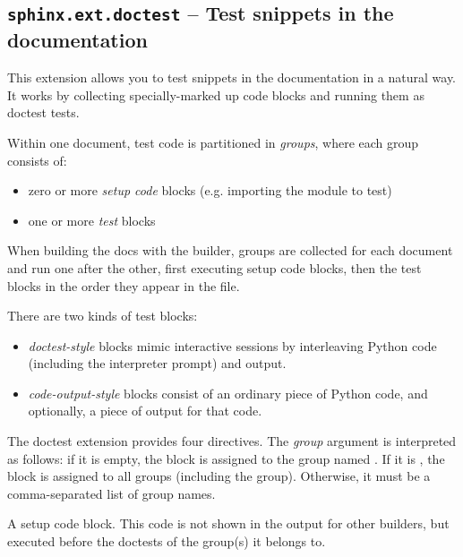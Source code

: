 \documentclass[letterpaper,10pt,english]{sphinxmanual}
\begin{document}
\subsection{\texttt{sphinx.ext.doctest} -- Test snippets in the documentation}
\label{ext/doctest::doc}\label{ext/doctest:module-sphinx.ext.doctest}\label{ext/doctest:sphinx-ext-doctest-test-snippets-in-the-documentation}
This extension allows you to test snippets in the documentation in a natural
way.  It works by collecting specially-marked up code blocks and running them as
doctest tests.

Within one document, test code is partitioned in \emph{groups}, where each group
consists of:
\begin{itemize}
\item {} 
zero or more \emph{setup code} blocks (e.g. importing the module to test)

\item {} 
one or more \emph{test} blocks

\end{itemize}

When building the docs with the  builder, groups are collected for
each document and run one after the other, first executing setup code blocks,
then the test blocks in the order they appear in the file.

There are two kinds of test blocks:
\begin{itemize}
\item {} 
\emph{doctest-style} blocks mimic interactive sessions by interleaving Python code
(including the interpreter prompt) and output.

\item {} 
\emph{code-output-style} blocks consist of an ordinary piece of Python code, and
optionally, a piece of output for that code.

\end{itemize}

The doctest extension provides four directives.  The \emph{group} argument is
interpreted as follows: if it is empty, the block is assigned to the group named
.  If it is \code{*}, the block is assigned to all groups (including the
 group).  Otherwise, it must be a comma-separated list of group
names.

\begin{fulllineitems}
\label{ext/doctest:directive-testsetup}
A setup code block.  This code is not shown in the output for other builders,
but executed before the doctests of the group(s) it belongs to.

\end{fulllineitems}
\end{document}
